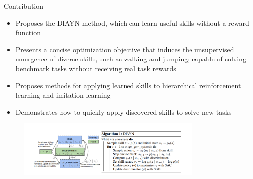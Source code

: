 \documentclass{beamer}
\begin{document}
\begin{frame}{Contribution}
	\footnotesize
	\vspace{-0.5cm}
	
	\begin{itemize}
		\item Proposes the DIAYN method, which can learn useful skills without a reward function
		\vspace{0.2cm}
		\item Presents a concise optimization objective that induces the unsupervised emergence of diverse skills, such as walking and jumping; capable of solving benchmark tasks without receiving real task rewards
		\vspace{0.2cm}
		\item Proposes methods for applying learned skills to hierarchical reinforcement learning and imitation learning
		\vspace{0.2cm}
		\item Demonstrates how to quickly apply discovered skills to solve new tasks
	\end{itemize}
	
	\begin{figure}[htbp] 
    		\centering 
    		\includegraphics[width=0.8\textwidth]{pic/al1.png}
	\end{figure}

\end{frame}
\end{document}
